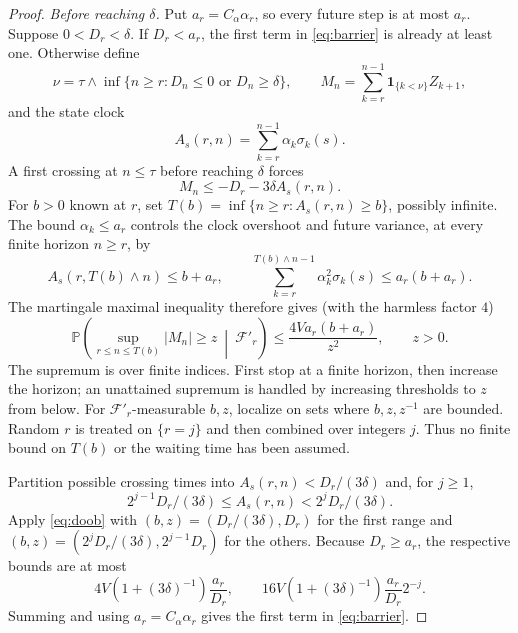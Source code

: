 \begin{proof}
\emph{Before reaching $\delta$.} Put $a_r=C_\alpha\alpha_r$, so every future step is at most $a_r$. Suppose $0<D_r<\delta$. If $D_r<a_r$, the first term in \eqref{eq:barrier} is already
at least one. Otherwise define
\[
\nu=\tau\wedge\inf\{n\ge r:D_n\le0\text{ or }D_n\ge\delta\},\qquad
M_n=\sum_{k=r}^{n-1}\mathbf1_{\{k<\nu\}}Z_{k+1},
\]
and the state clock
\begin{equation}\label{eq:clock}
A_s(r,n)=\sum_{k=r}^{n-1}\alpha_k\sigma_k(s).
\end{equation}
A first crossing at $n\le\tau$ before reaching $\delta$ forces
\begin{equation}\label{eq:crossing}
M_n\le-D_r-3\delta A_s(r,n).
\end{equation}
For $b>0$ known at $r$, set $T(b)=\inf\{n\ge r:A_s(r,n)\ge b\}$, possibly infinite. The bound $\alpha_k\le a_r$ controls the clock overshoot and future variance, at every finite horizon $n\ge r$, by
\[
A_s(r,T(b)\wedge n)\le b+a_r,\qquad
\sum_{k=r}^{T(b)\wedge n-1}\alpha_k^2\sigma_k(s)\le a_r(b+a_r).
\]
The martingale maximal inequality therefore gives (with the harmless factor $4$)
\begin{equation}\label{eq:doob}
\mathbb P\!\left(\sup_{r\le n\le T(b)}|M_n|\ge z\ \middle|\ \mathcal F'_r\right)
\le\frac{4Va_r(b+a_r)}{z^2},\qquad z>0.
\end{equation}
The supremum is over finite indices. First stop at a finite horizon, then increase the horizon;
an unattained supremum is handled by increasing thresholds to $z$ from below. For $\mathcal F'_r$-measurable $b,z$, localize on sets where $b,z,z^{-1}$ are bounded. Random $r$ is treated on $\{r=j\}$
and then combined over integers $j$. Thus no finite bound on $T(b)$ or the waiting time has
been assumed.

Partition possible crossing times into $A_s(r,n)<D_r/(3\delta)$ and, for $j\ge1$,
\[
2^{j-1}D_r/(3\delta)\le A_s(r,n)<2^jD_r/(3\delta).
\]
Apply \eqref{eq:doob} with $(b,z)=(D_r/(3\delta),D_r)$ for the first range and $(b,z)=(2^jD_r/(3\delta),2^{j-1}D_r)$
for the others. Because $D_r\ge a_r$, the respective bounds are at most
\[
4V(1+(3\delta)^{-1})\frac{a_r}{D_r},\qquad
16V(1+(3\delta)^{-1})\frac{a_r}{D_r}2^{-j}.
\]
Summing and using $a_r=C_\alpha\alpha_r$ gives the first term in \eqref{eq:barrier}.


\end{proof}

